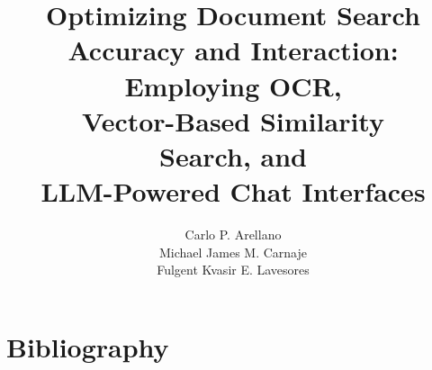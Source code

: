 \documentclass[oneside]{um}
\title{Optimizing Document Search\\Accuracy and Interaction:\\
       Employing OCR,\\Vector-Based Similarity\\ Search,
       and\\LLM-Powered Chat Interfaces
}                                                   %
\author{Carlo P. Arellano\\
        Michael James M. Carnaje\\
        Fulgent Kvasir E. Lavesores}                              %
\begin{document}
\frontmatter 
    \maketitle
    \if@openright\cleardoublepage\else\clearpage\fi
    \tableofcontents*\if@openright\cleardoublepage\else\clearpage\fi
    \listoffigures*\if@openright\cleardoublepage\else\clearpage\fi
    \listoftables*\if@openright\cleardoublepage\else\clearpage\fi

\pagestyle{umpage}
\mainmatter 
     
    
    
    

    \appendix
             

{\backmatter
    \if@openright\cleardoublepage\else\clearpage\fi
    \section*{Bibliography}
    \printbibliography %
    \printindex
}
\end{document}
